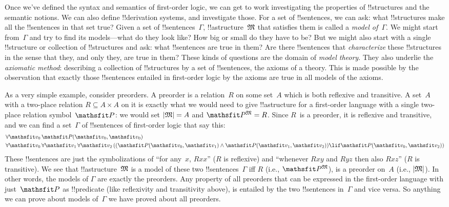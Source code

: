 \documentclass[../../../include/open-logic-section]{subfiles}
\begin{document}


Once we've defined the syntax and semantics of first-order logic, we
can get to work investigating the properties of !!{structure}s and the
semantic notions. We can also define !!{derivation} systems, and
investigate those.  For a set of !!{sentence}s, we can ask: what
!!{structure}s make all the !!{sentence}s in that set true?  Given a
set of !!{sentence}s~$\Gamma$, !!a{structure}~$\Struct{M}$ that
satisfies them is called a \emph{model of~$\Gamma$}.  We might start
from~$\Gamma$ and try to find its models---what do they look like? How
big or small do they have to be? But we might also start with a single
!!{structure} or collection of !!{structure}s and ask: what
!!{sentence}s are true in them?  Are there !!{sentence}s that
\emph{characterize} these !!{structure}s in the sense that they, and
only they, are true in them? These kinds of questions are the domain
of \emph{model theory}.  They also underlie the \emph{axiomatic
  method}: describing a collection of !!{structure}s by a set of
!!{sentence}s, the axioms of a theory. This is made possible by the
observation that exactly those !!{sentence}s entailed in first-order
logic by the axioms are true in all models of the axioms.

As a very simple example, consider preorders. A preorder is a
relation~$R$ on some set~$A$ which is both reflexive and transitive.
A set~$A$ with a two-place relation $R \subseteq A \times A$ on it is
exactly what we would need to give !!a{structure} for a first-order
language with a single two-place relation symbol~$\Obj P$: we would
set $\Domain{M} = A$ and $\Assign{\Obj P}{M} = R$.  Since $R$~is a
preorder, it is reflexive and transitive, and we can find a
set~$\Gamma$ of !!{sentence}s of first-order logic that say this:
\begin{align*}
  & \lforall[\Obj v_0][\Atom{\Obj P}{\Obj v_0,\Obj v_0}]\\
  & \lforall[\Obj v_0][\lforall[\Obj v_1][\lforall[\Obj v_2][((\Atom{\Obj P}{\Obj v_0,\Obj v_1} \land \Atom{\Obj P}{\Obj v_1,\Obj v_2}) \lif \Atom{\Obj P}{\Obj v_0,\Obj v_2})]]]
\end{align*}
These !!{sentence}s are just the symbolizations of ``for any~$x$,
$Rxx$'' ($R$ is reflexive) and ``whenever $Rxy$ and $Ryz$ then also
$Rxz$'' ($R$ is transitive). We see that !!a{structure}~$\Struct{M}$
is a model of these two !!{sentence}s~$\Gamma$ iff $R$ (i.e.,
$\Assign{\Obj P}{M}$), is a preorder on~$A$ (i.e., $\Domain{M}$). In
other words, the models of $\Gamma$ are exactly the preorders. Any
property of all preorders that can be expressed in the first-order
language with just~$\Obj P$ as !!{predicate} (like reflexivity and
transitivity above), is entailed by the two !!{sentence}s in~$\Gamma$
and vice versa.  So anything we can prove about models of~$\Gamma$ we
have proved about all preorders.
\end{document}
